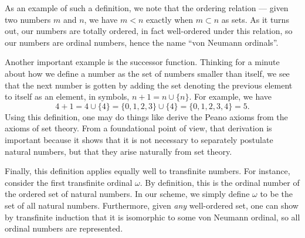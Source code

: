 \documentclass[12pt]{article}
\begin{document}
As an example of such a definition, we note that the ordering relation ---
given two numbers $m$ and $n$, we have $m < n$ exactly when $m \subset n$
as sets.  As it turns out, our numbers are totally ordered, in fact
well-ordered under this relation, so our numbers are ordinal numbers,
hence the name ``von Neumann ordinals''.

Another important example is the successor function.  Thinking for a
minute about how we define a number as the set of numbers smaller
than itself, we see that the next number is gotten by adding the 
set denoting the previous element to itself as an element, in symbols,
$n + 1 = n \cup \{ n \}$.  For example, we have
\[
4 + 1 =
4 \cup \{ 4 \} =
\{ 0, 1, 2, 3 \} \cup \{ 4 \} =
\{ 0, 1, 2, 3, 4 \} =
5.
\]
Using this definition, one may do things like derive the Peano
axioms from the axioms of set theory.  From a foundational point
of view, that derivation is important because it shows that it is
not necessary to separately postulate natural numbers, but that
they arise naturally from set theory.

Finally, this definition applies equally well to transfinite numbers.
For instance, consider the first transfinite ordinal $\omega$.  By 
definition, this is the ordinal number of the ordered set of natural
numbers.  In our scheme, we simply define $\omega$ to be the set of
all natural numbers.  Furthermore, given \emph{any} well-ordered set,
one can show by transfinite induction that it is isomorphic to some
von Neumann ordinal, so all ordinal numbers are represented.
\end{document}
